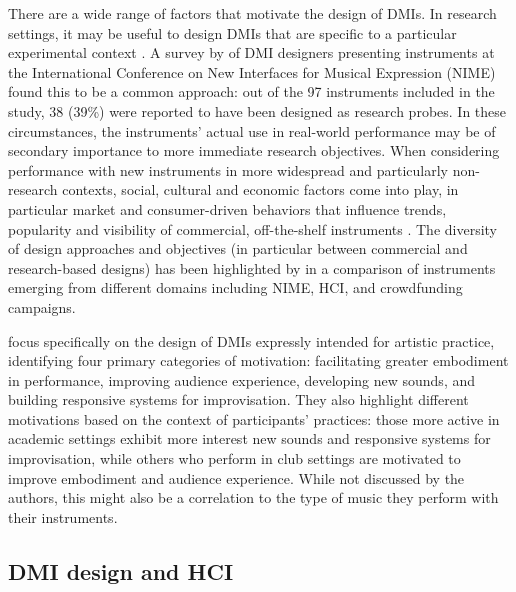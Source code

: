 \documentclass[letterpaper, 12pt]{article}
\begin{document}
There are a wide range of factors that motivate the design of DMIs. In research settings, it may be useful to design DMIs that are specific to a particular experimental context \citep{Marquez-borbon2011}. A survey by \citet{Morreale2017} of DMI designers presenting instruments at the International Conference on New Interfaces for Musical Expression (NIME) found this to be a common approach: out of the 97 instruments included in the study, 38 (39\%) were reported to have been designed as research probes. In these circumstances, the instruments' actual use in real-world performance may be of secondary importance to more immediate research objectives. When considering performance with new instruments in more widespread and particularly non-research contexts, social, cultural and economic factors come into play, in particular market and consumer-driven behaviors that influence trends, popularity and visibility of commercial, off-the-shelf instruments \citep{Theberge1997}. The diversity of design approaches and objectives (in particular between commercial and research-based designs) has been highlighted by \citet{mcpherson2019musical} in a comparison of instruments emerging from different domains including NIME, HCI, and crowdfunding campaigns. 

\citet{Emerson2018} focus specifically on the design of DMIs expressly intended for artistic practice, identifying four primary categories of motivation: facilitating greater embodiment in performance, improving audience experience, developing new sounds, and building responsive systems for improvisation. They also highlight different motivations based on the context of participants' practices: those more active in academic settings exhibit more interest new sounds and responsive systems for improvisation, while others who perform in club settings are motivated to improve embodiment and audience experience. While not discussed by the authors, this might also be a correlation to the type of music they perform with their instruments. 

\subsection{DMI design and HCI}
\label{sec:dmi-design-and-hci}
\end{document}
